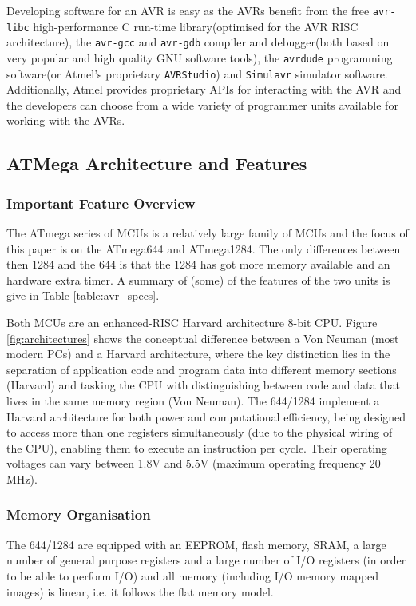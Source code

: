 \documentclass[10pt,a4paper,twocolumn]{article}
\begin{document}
	Developing software for an AVR is easy as the AVRs benefit from the free \texttt{avr-libc} high-performance C run-time library(optimised for the AVR RISC architecture), the \texttt{avr-gcc} and \texttt{avr-gdb} compiler and debugger(both based on very popular and high quality GNU software tools), the \texttt{avrdude} programming software(or Atmel's proprietary \texttt{AVRStudio}) and \texttt{Simulavr} simulator software. Additionally, Atmel provides proprietary APIs for interacting with the AVR and the developers can choose from a wide variety of programmer units available for working with the AVRs\cite{book:practical_avr}.
	
	\subsection{ATMega Architecture and Features}				

	\subsubsection{Important Feature Overview}
	The ATmega series of MCUs is a relatively large family of MCUs and the focus of this paper is on the ATmega644 and ATmega1284. The only differences between then 1284 and the 644 is that the 1284 has got more memory available and an hardware extra timer. A summary of (some) of the features of the two units is give in Table \ref{table:avr_specs}\citep{atmega_manual}. 
	
	Both MCUs are an enhanced-RISC Harvard architecture 8-bit CPU. Figure \ref{fig:architectures} shows the conceptual difference between a Von Neuman (most modern PCs) and a Harvard architecture, where the key distinction lies in the separation of application code and program data into different memory sections (Harvard) and tasking the CPU with distinguishing between code and data that lives in the same memory region (Von Neuman). The 644/1284 implement a Harvard architecture for both power and computational efficiency, being designed to access more than one registers simultaneously (due to the physical wiring of the CPU), enabling them to execute an instruction per cycle. Their operating voltages can vary between 1.8V and 5.5V (maximum operating frequency 20 MHz).
	
	\subsubsection{Memory Organisation}
	The 644/1284 are equipped with an EEPROM, flash memory, SRAM, a large number of general purpose registers and a large number of I/O registers (in order to be able to perform I/O) and all memory (including I/O memory mapped images) is linear, i.e. it follows the flat memory model.
	
\end{document}
